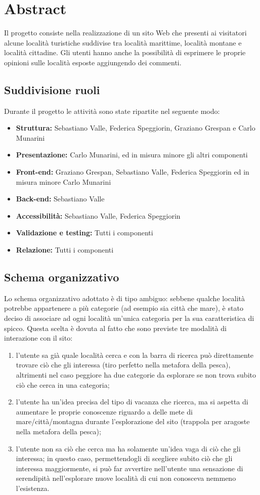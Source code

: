 \section{Abstract}
Il progetto consiste nella realizzazione di un sito Web che presenti ai
visitatori alcune località turistiche suddivise tra località marittime,
località montane e località cittadine.
Gli utenti hanno anche la possibilità di esprimere le proprie opinioni sulle
località esposte aggiungendo dei commenti.

\subsection{Suddivisione ruoli}
Durante il progetto le attività sono state ripartite nel seguente modo:
\begin{itemize}
\item \textbf{Struttura:} Sebastiano Valle, Federica Speggiorin, Graziano Grespan e Carlo Munarini
\item \textbf{Presentazione:} Carlo Munarini, ed in misura minore gli altri componenti
\item \textbf{Front-end:} Graziano Grespan, Sebastiano Valle, Federica Speggiorin ed in misura minore Carlo Munarini
\item \textbf{Back-end:} Sebastiano Valle
\item \textbf{Accessibilità:} Sebastiano Valle, Federica Speggiorin
\item \textbf{Validazione e testing:} Tutti i componenti
\item \textbf{Relazione:} Tutti i componenti
\end{itemize}

\subsection{Schema organizzativo}
Lo schema organizzativo adottato è di tipo ambiguo: sebbene qualche località potrebbe appartenere a più categorie (ad esempio sia città che mare), è stato deciso di associare ad ogni località un'unica categoria per la sua caratteristica di spicco.
Questa scelta è dovuta al fatto che sono previste tre modalità di interazione con il sito:
\begin{enumerate}
\item  l'utente sa già quale località cerca e con la barra di ricerca può direttamente trovare ciò che gli interessa (tiro perfetto nella metafora della pesca), altrimenti nel caso peggiore ha due categorie da esplorare se non trova subito ciò che cerca in una categoria;
\item l'utente ha un'idea precisa del tipo di vacanza che ricerca, ma si aspetta di aumentare le proprie conoscenze riguardo a delle mete di mare/città/montagna durante l'esplorazione del sito (trappola per aragoste nella metafora della pesca);
\item l'utente non sa ciò che cerca ma ha solamente un'idea vaga di ciò che gli interessa; in questo caso, permettendogli di scegliere subito ciò che gli interessa maggiormente, si può far avvertire nell'utente una sensazione di serendipità nell'esplorare nuove località di cui non conosceva nemmeno l'esistenza.
\end{enumerate}
